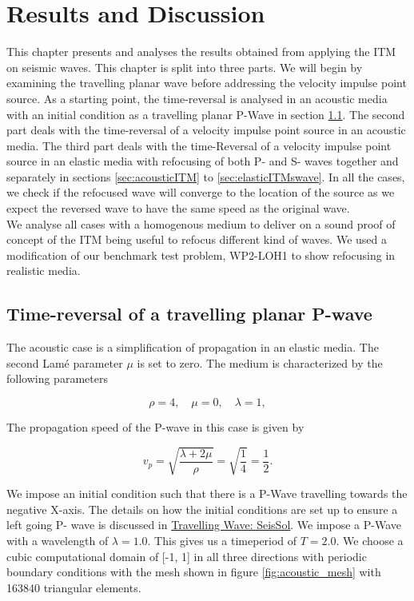 \chapter{Results and Discussion}\label{chapter:Results}

This chapter presents and analyses the results obtained from applying the \ac{ITM} on seismic waves. This chapter is split into three parts.
We will begin by examining the travelling planar wave before addressing the velocity impulse point source. 
As a starting point, the time-reversal is analysed in an acoustic media with an initial condition
as a travelling planar P-Wave in section \ref{sec:acoustictravelling}. The second part deals with the time-reversal of a velocity impulse point source in an acoustic media. The third part deals with the time-Reversal
of a velocity impulse point source in an elastic media with refocusing of both P- and S- waves together and separately in sections \ref{sec:acousticITM} to \ref{sec:elasticITMswave}. 
In all the cases, we check if the refocused
wave will converge to the location of the source as we expect the reversed wave to have the same speed as the original wave. \\

We analyse all cases with a homogenous medium to deliver on a sound proof of concept of the \ac{ITM} being useful to refocus different kind of waves. We used a modification
of our benchmark test problem, WP2-LOH1 to show refocusing in realistic media.

\section{Time-reversal of a travelling planar P-wave} \label{sec:acoustictravelling}
The acoustic case is a simplification of propagation in an elastic media. The second Lam\'{e} parameter $\mu$ is set to zero. The medium is characterized by the following parameters

\begin{equation}
    \rho = 4, \quad \mu = 0, \quad \lambda = 1 ,
\end{equation}

The propagation speed of the P-wave in this case is given by

\begin{equation}
    v_p = \sqrt{\frac{\lambda + 2 \mu}{\rho}} = \sqrt{\frac{1}{4}} = \frac{1}{2} .
\end{equation}

We impose an initial condition such that there is a P-Wave travelling towards the negative X-axis. The details on how the initial conditions are set up to ensure a left going P- wave is discussed in
\href{https://seissol.readthedocs.io/en/latest/initial-condition.html#travelling-wave}{Travelling Wave: SeisSol}. We impose a P-Wave with a wavelength of 
$\lambda = 1.0$. This gives us a timeperiod of $T=2.0$. We choose a cubic computational domain of [-1, 1] in all three directions with periodic boundary conditions with the mesh shown in figure \ref{fig:acoustic_mesh} with
163840 triangular elements. 

